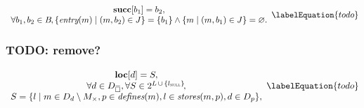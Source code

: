 

\begin{equation}
  \begin{array}{c}
    \mVar{succ}[b_1] = b_2, \\
    \forall b_1, b_2 \in \mBlockSet \hspace{-1pt},
    \mSetBuilder{\mEntry(m)}{\mPair{m}{b_2} \in \mFallThroughSet} = \mSet{b_1}
    \mAnd
    \mSetBuilder{m}{\mPair{m}{b_1} \in \mFallThroughSet} = \mEmptySet.
  \end{array}
  \labelEquation{todo}
\end{equation}



\subsubsection{TODO: remove?}


\begin{equation}
  \begin{array}{c}
    \mVar{loc}[d] = S, \\
    \forall d \in \mStateDataCompSet,
    \forall S \in
      \mPowerset{\mLocationSet \, \cup \, \mSet{\mNullLocation}} \!, \\
    S = \mSetBuilder{l}%
                    {%
                      m \in \mDataSet[d] \setminus \mKillMatchSet,
                      p \in \mDefines(m),
                      l \in \mStores(m, p),
                      d \in \mDataSet[p]
                    },
  \end{array}
  \labelEquation{todo}
\end{equation}



